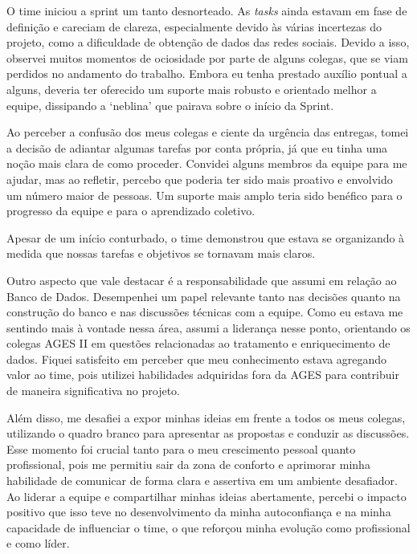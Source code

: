 \begin{reflection}
\indent \originaltab{}O time iniciou a sprint um tanto desnorteado. As \textit{tasks} ainda estavam em fase de definição e careciam de clareza, especialmente devido às várias incertezas do projeto, como a dificuldade de obtenção de dados das redes sociais. Devido a isso, observei muitos momentos de ociosidade por parte de alguns colegas, que se viam perdidos no andamento do trabalho. Embora eu tenha prestado auxílio pontual a alguns, deveria ter oferecido um suporte mais robusto e orientado melhor a equipe, dissipando a ‘neblina’ que pairava sobre o início da Sprint.\par

\indent \originaltab{}Ao perceber a confusão dos meus colegas e ciente da urgência das entregas, tomei a decisão de adiantar algumas tarefas por conta própria, já que eu tinha uma noção mais clara de como proceder. Convidei alguns membros da equipe para me ajudar, mas ao refletir, percebo que poderia ter sido mais proativo e envolvido um número maior de pessoas. Um suporte mais amplo teria sido benéfico para o progresso da equipe e para o aprendizado coletivo.\par

\indent \originaltab{}Apesar de um início conturbado, o time demonstrou que estava se organizando à medida que nossas tarefas e objetivos se tornavam mais claros.\par

\indent \originaltab{}Outro aspecto que vale destacar é a responsabilidade que assumi em relação ao Banco de Dados. Desempenhei um papel relevante tanto nas decisões quanto na construção do banco e nas discussões técnicas com a equipe. Como eu estava me sentindo mais à vontade nessa área, assumi a liderança nesse ponto, orientando os colegas AGES II em questões relacionadas ao tratamento e enriquecimento de dados. Fiquei satisfeito em perceber que meu conhecimento estava agregando valor ao time, pois utilizei habilidades adquiridas fora da AGES para contribuir de maneira significativa no projeto.\par

\indent \originaltab{}Além disso, me desafiei a expor minhas ideias em frente a todos os meus colegas, utilizando o quadro branco para apresentar as propostas e conduzir as discussões. Esse momento foi crucial tanto para o meu crescimento pessoal quanto profissional, pois me permitiu sair da zona de conforto e aprimorar minha habilidade de comunicar de forma clara e assertiva em um ambiente desafiador. Ao liderar a equipe e compartilhar minhas ideias abertamente, percebi o impacto positivo que isso teve no desenvolvimento da minha autoconfiança e na minha capacidade de influenciar o time, o que reforçou minha evolução como profissional e como líder.\par

\end{reflection}
